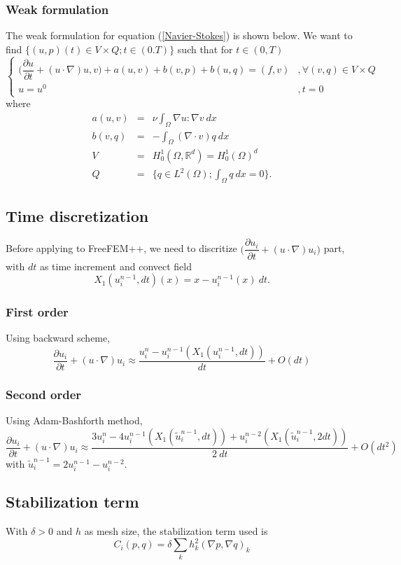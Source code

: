 \documentclass[a4paper]{article}
\newcommand{\R}{\mathbb{R}}
\begin{document}
\subsubsection{Weak formulation}
The weak formulation for equation (\ref{Navier-Stokes}) is shown below. We want to find $ \{ (u,p)(t) \in V \times Q ; t \in (0.T) \} $ such that for $ t \in (0,T) $
\begin{equation} \label{NS_Weak}
\begin{cases}
\big( \dfrac{\partial u}{\partial t} + (u \cdot \nabla)u,v \big) + a(u,v) + b(v,p) + b(u,q) = (f,v) & ,\forall(v,q)\in V\times Q \\ u=u^{0} & , t=0
\end{cases}
\end{equation}
where
\begin{eqnarray}\nonumber
a(u,v) &=& \nu \int_{\Omega} \nabla u : \nabla v \ dx \\ \nonumber
b(v,q) &=& - \int_{\Omega} (\nabla \cdot v) q \ dx \\ \nonumber
V &=& H_{0}^{1}(\Omega, \R^d) = H_{0}^{1}(\Omega)^d \\ \nonumber
Q &=& \{ q\in L^2(\Omega) ; \int_{\Omega} q \ dx=0 \}.
\end{eqnarray}

\subsection{Time discretization}
Before applying to FreeFEM++, we need to discritize $ \Big(\dfrac{\partial u_{i}}{\partial t} + (u \cdot \nabla)u_{i}\Big) $ part, with $ dt $ as time increment and convect field
\[ X_{1}(u_{i}^{n-1},dt)(x) = x - u_{i}^{n-1}(x)\ dt.\]
\subsubsection{First order}
Using backward scheme, 
\[ \dfrac{\partial u_{i}}{\partial t} + (u \cdot \nabla)u_{i} \approx \dfrac{u_{i}^{n}-u_{i}^{n-1}(X_{1}(u_{i}^{n-1},dt))}{dt} + O(dt) \]
\subsubsection{Second order}
Using Adam-Bashforth method,
\[\dfrac{\partial u_{i}}{\partial t} + (u \cdot \nabla)u_{i} \approx \dfrac{3u_{i}^{n}-4u_{i}^{n-1}(X_{1}(\tilde{u}_{i}^{n-1},dt))+u_{i}^{n-2}(X_{1}(\tilde{u}_{i}^{n-1},2dt))}{2\ dt} + O(dt^2)\]
with $ \tilde{u}_{i}^{n-1} = 2u_{i}^{n-1}-u_{i}^{n-2} $.
\subsection{Stabilization term}
With $ \delta>0 $ and $ h $ as mesh size, the stabilization term used is
\[ C_{i}(p,q) = \delta \sum_{k} h_{k}^{2}(\nabla p, \nabla q)_{k} \]
\end{document}
